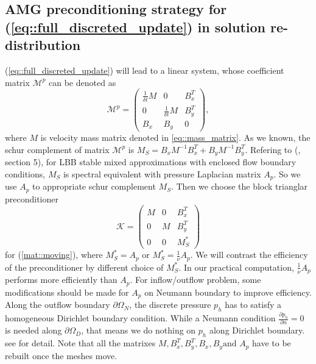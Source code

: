 \documentclass{eajam}
\begin{document}
   \subsection{AMG preconditioning strategy for
     (\ref{eq::full_discreted_update}) in solution re-distribution}
   (\ref{eq::full_discreted_update}) will lead to a linear
   system, whose coefficient matrix $\mathcal{M}^p$ can be denoted as
   \begin{equation}
     \mathcal{M}^p = 
     \left(
       \begin{array}{lll}
         \frac{1}{\delta t} M & 0 & B_x^T \\
         0 & \frac{1}{\delta t} M & B_y^T \\
         B_x & B_y & 0
       \end{array}
     \right),
     \label{mat::moving}
   \end{equation}
   where $M$ is velocity mass matrix denoted in
   \eqref{eq::mass_matrix}.
   As we known, the schur complement of matrix $\mathcal{M}^p$ is 
   $M_S = B_x M^{-1} B_x^T + B_y M^{-1} B_y^T$. Refering to
   (\cite{elman2005finite}, section 5), for LBB stable mixed
   approximations with enclosed flow boundary conditions, $M_S$ is
   spectral equivalent with pressure Laplacian matrix $A_p$. So we
   use $A_p$ to appropriate schur complement $M_S$. Then we
   choose the block trianglar preconditioner
   \begin{equation}
     \mathcal{K} =
     \left(
       \begin{array}{lll}
         M & 0 & B_x^T \\
         0 & M & B_y^T \\
         0 & 0 & M_S^* 
       \end{array}
     \right)
     \label{eq::updateSolution_precond}
   \end{equation}
   for (\ref{mat::moving}), where $M_S^* = A_p$ or $M_S^* =
   \frac{1}{\nu} A_p$. We will contrast the efficiency of the
   preconditioner by different choice of $M_S^*$.  In our
   practical computation, $\frac{1}{\nu}A_p$ performs more efficiently
   than $A_p$. For inflow/outflow problem, some modifications should
   be made for $A_p$ on Neumann boundary to improve efficiency. Along 
   the outflow boundary $\partial \Omega_N$, the discrete pressure $p_h$
   has to satisfy a homogeneous Dirichlet boundary condition. While
   a Neumann condition $\frac{\partial p_h}{\partial n} = 0$ is
   needed along $\partial \Omega_D$, that means we do nothing on
   $p_h$ along Dirichlet boundary. see \cite{elman2009boundary}
   for detail.
   Note that all the matrixes $M, B_x^T, B_y^T, B_x,
   B_y \mbox{and } A_p$ have to be rebuilt once the meshes move. 
\end{document}
